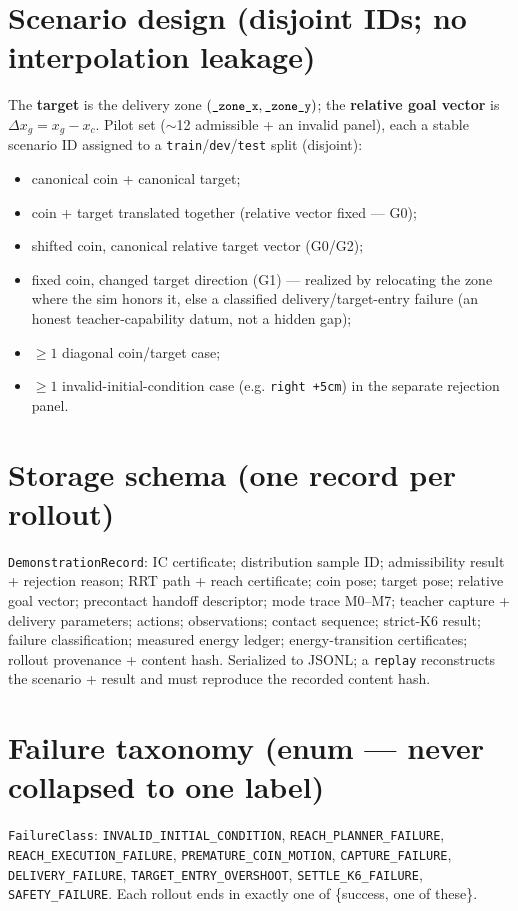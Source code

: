 \documentclass[11pt]{article}
\newcommand{\code}[1]{\texttt{\small #1}}
\begin{document}
\section{Scenario design (disjoint IDs; no interpolation leakage)}
The \textbf{target} is the delivery zone $(\code{\_zone\_x},\code{\_zone\_y})$; the \textbf{relative goal vector} is
$\Delta x_g = x_g - x_c$. Pilot set ($\sim$12 admissible + an invalid panel), each a stable scenario ID assigned to a
\code{train}/\code{dev}/\code{test} split (disjoint):
\begin{itemize}[nosep,leftmargin=1.4em]
  \item canonical coin + canonical target;
  \item coin + target translated together (relative vector fixed --- G0);
  \item shifted coin, canonical relative target vector (G0/G2);
  \item fixed coin, changed target direction (G1) --- realized by relocating the zone where the sim honors it, else a
  classified delivery/target-entry failure (an honest teacher-capability datum, not a hidden gap);
  \item $\geq 1$ diagonal coin/target case;
  \item $\geq 1$ invalid-initial-condition case (e.g. \code{right +5cm}) in the separate rejection panel.
\end{itemize}

\section{Storage schema (one record per rollout)}
\code{DemonstrationRecord}: IC certificate; distribution sample ID; admissibility result + rejection reason; RRT path +
reach certificate; coin pose; target pose; relative goal vector; precontact handoff descriptor; mode trace M0--M7; teacher
capture + delivery parameters; actions; observations; contact sequence; strict-K6 result; failure classification; measured
energy ledger; energy-transition certificates; rollout provenance + content hash. Serialized to JSONL; a \code{replay}
reconstructs the scenario + result and must reproduce the recorded content hash.

\section{Failure taxonomy (enum --- never collapsed to one label)}
\code{FailureClass}: \code{INVALID\_INITIAL\_CONDITION}, \code{REACH\_PLANNER\_FAILURE}, \code{REACH\_EXECUTION\_FAILURE},
\code{PREMATURE\_COIN\_MOTION}, \code{CAPTURE\_FAILURE}, \code{DELIVERY\_FAILURE}, \code{TARGET\_ENTRY\_OVERSHOOT},
\code{SETTLE\_K6\_FAILURE}, \code{SAFETY\_FAILURE}. Each rollout ends in exactly one of \{success, one of these\}.
\end{document}
